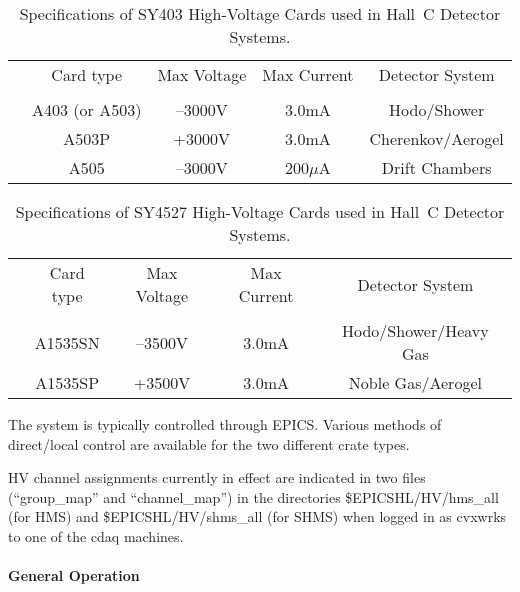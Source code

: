 {\begin{table}
\caption{Specifications of SY403 High-Voltage Cards used in Hall~C Detector
Systems\label{tab:hv_cards}.}
\begin{center}
\begin{tabular}{ccccc}
        &Card type      &Max Voltage    &Max Current    &Detector System \\
	&		&		&		&	\\
	& A403 (or A503)&--3000V	&3.0mA		&Hodo/Shower\\
	& A503P		&+3000V		&3.0mA		&Cherenkov/Aerogel\\
	& A505		&--3000V	&200$\mu$A 	&Drift Chambers\\
  \end{tabular}
\end{center}
\end{table}

\begin{table}
\caption{Specifications of SY4527 High-Voltage Cards used in Hall~C Detector
Systems\label{tab:hv_cards_new}.}
\begin{center}
\begin{tabular}{ccccc}
  &Card type      &Max Voltage    &Max Current    &Detector System \\
  &		&		&		&	\\
  & A1535SN       &--3500V	&3.0mA		&Hodo/Shower/Heavy Gas\\
  & A1535SP       &+3500V    &3.0mA		&Noble Gas/Aerogel\\

  \end{tabular}
\end{center}
\end{table}

The system is typically controlled through EPICS.  Various methods of
direct/local control are available for the two different crate types.


HV channel assignments currently in effect are indicated in
two files (``group\_map'' and
``channel\_map'') in the directories \$EPICSHL/HV/hms\_all (for HMS) and
\$EPICSHL/HV/shms\_all (for
SHMS) when logged in as cvxwrks to one of the cdaq machines.

\paragraph{General Operation}

}

